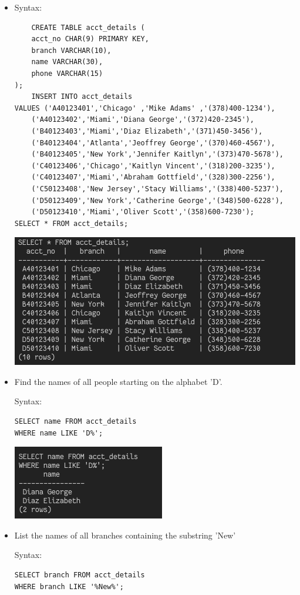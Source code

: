 \documentclass[13pt,oneside]{book}
\begin{document}
\begin{itemize}
\item 
Syntax:
\begin{verbatim}
	CREATE TABLE acct_details (
	acct_no CHAR(9) PRIMARY KEY,
	branch VARCHAR(10),
	name VARCHAR(30),
	phone VARCHAR(15)	
);
	INSERT INTO acct_details 
VALUES ('A40123401','Chicago' ,'Mike Adams' ,'(378)400-1234'),
	('A40123402','Miami','Diana George','(372)420-2345'),
	('B40123403','Miami','Diaz Elizabeth','(371)450-3456'),
	('B40123404','Atlanta','Jeoffrey George','(370)460-4567'),
	('B40123405','New York','Jennifer Kaitlyn','(373)470-5678'),
	('C40123406','Chicago','Kaitlyn Vincent','(318)200-3235'),
	('C40123407','Miami','Abraham Gottfield','(328)300-2256'),
	('C50123408','New Jersey','Stacy Williams','(338)400-5237'),
	('D50123409','New York','Catherine George','(348)500-6228'),
	('D50123410','Miami','Oliver Scott','(358)600-7230');
SELECT * FROM acct_details;
\end{verbatim}
\includegraphics[]{img/p6/ss0.png}

\item
Find the names of all people starting on the alphabet 'D’.
 
Syntax:
\begin{verbatim}
SELECT name FROM acct_details
WHERE name LIKE 'D%';

\end{verbatim}
\includegraphics[]{img/p6/ss1.png}


\item
List the names of all branches containing the substring 'New’
 
Syntax:
\begin{verbatim}
SELECT branch FROM acct_details
WHERE branch LIKE '%New%';


\end{verbatim}
\end{itemize}
\end{document}

